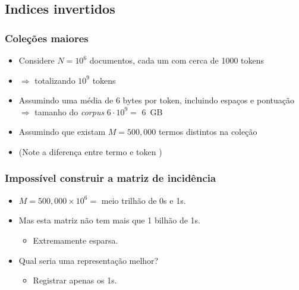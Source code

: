 \documentclass[compress]{beamer}
\begin{document}
\subsection{Indices invertidos}

\begin{frame}
\frametitle{Coleções maiores}
\begin{itemize}[<+->]
\item Considere $N= 10^6$ documentos, cada um com cerca de 1000 tokens
\item $\Rightarrow$ totalizando $10^9$ tokens
\item Assumindo uma média de 6 bytes por token, incluindo espaços e pontuação
$\Rightarrow$ tamanho do \emph{corpus} $6 \cdot
  10^9=$ 6~GB
\item Assumindo que existam $M=500{,}000$ termos distintos na coleção
\item (Note a diferença entre termo e token )
\end{itemize}
\end{frame}

\begin{frame}
\frametitle{Impossível construir a matriz de incidência}
\begin{itemize}[<+->]
\item 
 $M=500{,}000 \times
10^6 = $ meio trilhão de 0s e 1s.
\item Mas esta matriz não tem mais que 1 bilhão de 1s. 
\begin{itemize}[<+->]
\item Extremamente esparsa.
\end{itemize}
\item Qual seria uma representação melhor?
\begin{itemize}[<+->]
\item Registrar apenas os 1s.
\end{itemize}
\end{itemize}
\end{frame}
\end{document}
